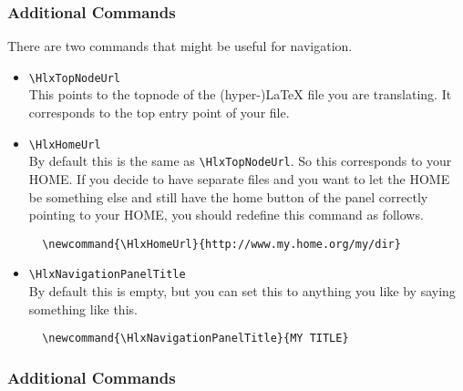 \subsubsection{Additional Commands}

There are two commands that might be useful for navigation.
\begin{itemize}
\item \verb'\HlxTopNodeUrl'\\
  This points to the topnode of the (hyper-)\LaTeX{} file you are
  translating. It corresponds to the top entry point of your file.
\item \verb'\HlxHomeUrl'\\
  By default this is the same as \verb'\HlxTopNodeUrl'. So this
  corresponds to your HOME. If you decide to have separate files and
  you want to let the HOME be something else and still have the home
  button of the panel correctly pointing to your HOME, you should
  redefine this command as follows.\\
\begin{verbatim}
  \newcommand{\HlxHomeUrl}{http://www.my.home.org/my/dir}
\end{verbatim}
\item \verb'\HlxNavigationPanelTitle'\\
  By default this is empty, but you can set this to anything you like
  by saying something like this.
\begin{verbatim}
  \newcommand{\HlxNavigationPanelTitle}{MY TITLE}
\end{verbatim}
\end{itemize}

\subsubsection{Additional Commands}

